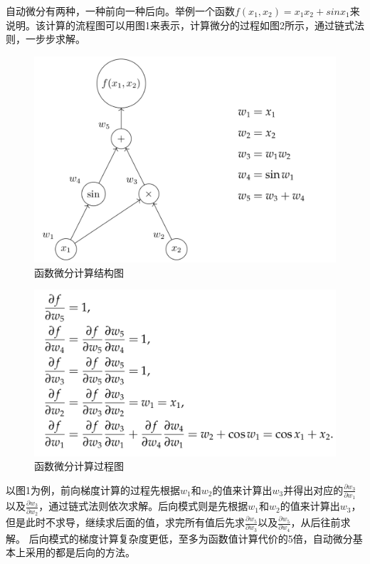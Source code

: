\documentclass{article}
\begin{document}
自动微分有两种，一种前向一种后向。举例一个函数$f(x_1,x_2)=x_1x_2+sin x_1$来说明。该计算的流程图可以用图1来表示，计算微分的过程如图2所示，通过链式法则，一步步求解。
\begin{figure}[h]
    \centering
    \includegraphics[scale=0.3]{1.png}
    \caption{函数微分计算结构图}
\end{figure}

\begin{figure}[h]
    \centering
    \includegraphics[scale=0.3]{2.png}
    \caption{函数微分计算过程图}
\end{figure}
以图1为例，前向梯度计算的过程先根据$w_1$和$w_2$的值来计算出$w_3$并得出对应的$\frac{\partial w_3}{\partial w_1}$以及$\frac{\partial w_3}{\partial w_2}$，通过链式法则依次求解。后向模式则是先根据$w_1$和$w_2$的值来计算出$w_3$，但是此时不求导，继续求后面的值，求完所有值后先求$\frac{\partial w_5}{\partial w_3}$以及$\frac{\partial w_5}{\partial w_4}$，从后往前求解。
后向模式的梯度计算复杂度更低，至多为函数值计算代价的5倍，自动微分基本上采用的都是后向的方法。
\end{document}
